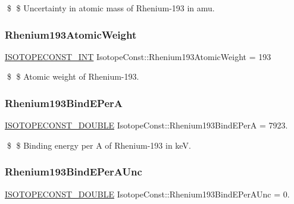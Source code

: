 \$ \$ Uncertainty in atomic mass of Rhenium-\/193 in amu. \mbox{\label{group___isotope_const-_rhenium-_re193_gac404a0d6eab49b0e084075d1a3dde4e5}} 
\subsubsection{\texorpdfstring{Rhenium193\+Atomic\+Weight}{Rhenium193AtomicWeight}}
{\footnotesize\ttfamily \mbox{\hyperlink{group___isotope_const-_macros_ga5f18360b3e99483a35c32d789e62621c}{I\+S\+O\+T\+O\+P\+E\+C\+O\+N\+S\+T\+\_\+\+I\+NT}} Isotope\+Const\+::\+Rhenium193\+Atomic\+Weight = 193}

\$ \$ Atomic weight of Rhenium-\/193. \mbox{\label{group___isotope_const-_rhenium-_re193_ga509c5ae33ba2b38d0b6aa2d8d1029c98}} 
\subsubsection{\texorpdfstring{Rhenium193\+Bind\+E\+PerA}{Rhenium193BindEPerA}}
{\footnotesize\ttfamily \mbox{\hyperlink{group___isotope_const-_macros_ga8f45a7272ce02c0b4c65c44636ed719a}{I\+S\+O\+T\+O\+P\+E\+C\+O\+N\+S\+T\+\_\+\+D\+O\+U\+B\+LE}} Isotope\+Const\+::\+Rhenium193\+Bind\+E\+PerA = 7923.}

\$ \$ Binding energy per A of Rhenium-\/193 in keV. \mbox{\label{group___isotope_const-_rhenium-_re193_ga29b7b8287db748b96cc3c9b311b66414}} 
\subsubsection{\texorpdfstring{Rhenium193\+Bind\+E\+Per\+A\+Unc}{Rhenium193BindEPerAUnc}}
{\footnotesize\ttfamily \mbox{\hyperlink{group___isotope_const-_macros_ga8f45a7272ce02c0b4c65c44636ed719a}{I\+S\+O\+T\+O\+P\+E\+C\+O\+N\+S\+T\+\_\+\+D\+O\+U\+B\+LE}} Isotope\+Const\+::\+Rhenium193\+Bind\+E\+Per\+A\+Unc = 0.}

